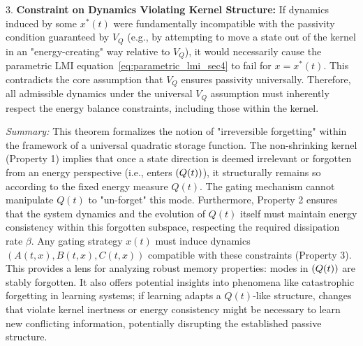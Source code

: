 \documentclass[10pt]{article} %
\def\eqref#1{equation~\ref{#1}}
\let\ker\relax\DeclareMathOperator{\ker}{Ker}           %
\theoremstyle{definition}
\begin{document}
3.  \textbf{Constraint on Dynamics Violating Kernel Structure:} If dynamics induced by some $x^*(t)$ were fundamentally incompatible with the passivity condition guaranteed by $V_Q$ (e.g., by attempting to move a state out of the kernel in an "energy-creating" way relative to $V_Q$), it would necessarily cause the parametric LMI \eqref{eq:parametric_lmi_sec4} to fail for $x=x^*(t)$. This contradicts the core assumption that $V_Q$ ensures passivity universally. Therefore, all admissible dynamics under the universal $V_Q$ assumption must inherently respect the energy balance constraints, including those within the kernel.

\textit{Summary:} This theorem formalizes the notion of "irreversible forgetting" within the framework of a universal quadratic storage function. The non-shrinking kernel (Property 1) implies that once a state direction is deemed irrelevant or forgotten from an energy perspective (i.e., enters $\ker(Q(t))$), it structurally remains so according to the fixed energy measure $Q(t)$. The gating mechanism cannot manipulate $Q(t)$ to "un-forget" this mode. Furthermore, Property 2 ensures that the system dynamics and the evolution of $Q(t)$ itself must maintain energy consistency within this forgotten subspace, respecting the required dissipation rate $\beta$. Any gating strategy $x(t)$ must induce dynamics $(A(t,x), B(t,x), C(t,x))$ compatible with these constraints (Property 3). This provides a lens for analyzing robust memory properties: modes in $\ker(Q(t))$ are stably forgotten. It also offers potential insights into phenomena like catastrophic forgetting in learning systems; if learning adapts a $Q(t)$-like structure, changes that violate kernel inertness or energy consistency might be necessary to learn new conflicting information, potentially disrupting the established passive structure.
\end{document}
